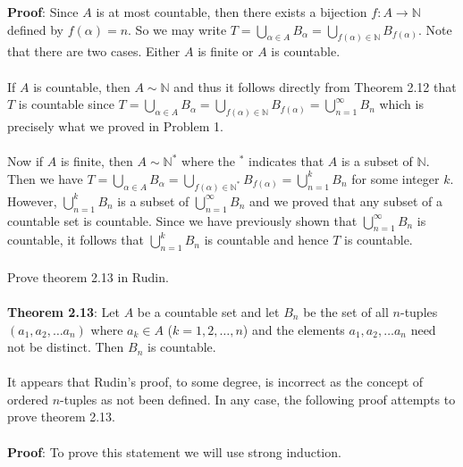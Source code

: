 \documentclass[12pt]{article}
\begin{document}
\noindent \textbf{Proof}: Since $A$ is at most countable, then there exists a bijection $f: A \rightarrow \mathbb{N}$ defined by $f(\alpha)=n$. So we may write $T= \bigcup_{\alpha \in A}B_{\alpha} = \bigcup_{f(\alpha) \in \mathbb{N}} B_{f(\alpha)}$. Note that there are two cases. Either $A$ is finite or $A$ is countable. \\ \\

If $A$ is countable, then $A \sim\mathbb{N}$ and thus it follows directly from Theorem 2.12 that $T$ is countable since $T= \bigcup_{\alpha \in A}B_{\alpha}=\bigcup_{f(\alpha) \in \mathbb{N}} B_{f(\alpha)} =  \bigcup^{\infty}_{n=1} B_{n}$ which is precisely what we proved in Problem 1. \\ \\

Now if $A$ is finite, then $A \sim \mathbb{N}^{*}$ where the $^{*}$ indicates that $A$ is a subset of $\mathbb{N}$. Then we have $T= \bigcup_{\alpha \in A}B_{\alpha}=\bigcup_{f(\alpha) \in \mathbb{N}^{*}} B_{f(\alpha)} =  \bigcup^{k}_{n=1} B_{n}$ for some integer $k$. However, $\bigcup^{k}_{n=1} B_{n}$ is a subset of $\bigcup^{\infty}_{n=1} B_{n}$ and we proved that any subset of a countable set is countable. Since we have previously shown that $\bigcup^{\infty}_{n=1} B_{n}$ is countable, it follows that $\bigcup^{k}_{n=1} B_{n}$ is countable and hence $T$ is countable. \\ \\



\problem Prove theorem 2.13 in Rudin. \\ \\
\textbf{Theorem 2.13}: Let $A$ be a countable set and let $B_{n}$ be the set of all $n$-tuples $(a_{1}, a_{2}, \ldots a_{n})$ where $a_{k} \in A$ ($k=1, 2, \ldots, n$) and the elements $a_{1}, a_{2}, \ldots a_{n}$ need not be distinct. Then $B_{n}$ is countable. \\ \\

It appears that Rudin's proof, to some degree, is incorrect as the concept of ordered $n$-tuples as not been defined. In any case, the following proof attempts to prove theorem 2.13. \\ \\

\noindent \textbf{Proof}: To prove this statement we will use strong induction.  \\ \\ 
\end{document}
